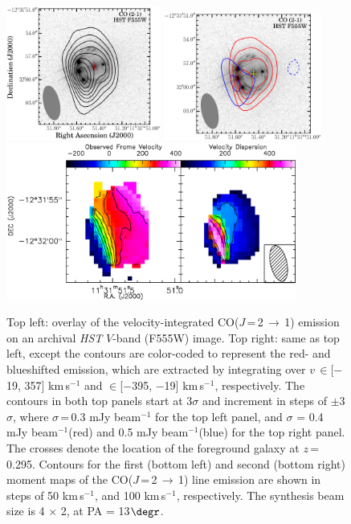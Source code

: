 \documentclass[]{emulateapj}
\newcommand{\rarr}{$\rightarrow$}
\newcommand{\bco}{\mbox{CO($J$\,=\,2\,\rarr\,1)}\xspace}
\newcommand{\kms}{\mbox{km\,s$^{-1}$}\xspace}
\newcommand{\pmOne}{\mbox{$^{-1}$}\xspace}
\begin{document}
\begin{figure}[!htbp]
\hspace{0.5em}
\includegraphics[trim=0 10 15 0, clip, width=0.452\textwidth]{f2a.eps}
\includegraphics[trim=5 -18 0 0, clip, width=0.462\textwidth]{f2b.eps}
\\
\includegraphics[trim=25 16 0 10, clip, width=0.85\textwidth]{f2c.eps}
\vspace{0.1em}
\caption{Top left: overlay of the velocity-integrated \bco emission on an archival {\it HST} $V$-band (F555W)
image.
Top right: same as top left, except the contours are color-coded to represent the red- and blueshifted emission, which
are extracted by integrating over $v$\,$\in$[$-$19, 357] \kms and $\in$[$-$395, $-$19] \kms, respectively.
The contours in both top panels start at 3$\sigma$ and increment in steps of
$\pm$3$\sigma$, where $\sigma$\,=\,0.3 mJy beam\pmOne for the top left panel,
and
$\sigma$ = 0.4 mJy beam\pmOne (red) and 0.5 mJy beam\pmOne (blue)
for the top right panel.
The crosses denote the
location of the foreground galaxy at $z$\,=\,0.295.
Contours for the first (bottom left) and second (bottom right) moment maps of the \bco line emission
are shown in steps of
50 \kms, and 100 \kms, respectively.
The synthesis beam size is 4 $\times$ 2, at PA = 13$\degr$.
\label{fig:CO21mom}}
\end{figure}
\end{document}
